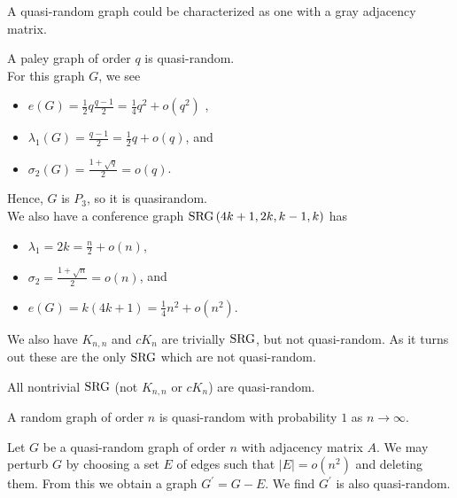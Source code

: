 \begin{recall}
	A quasi-random graph could be characterized as one with a gray adjacency matrix.
\end{recall}
\begin{example}
	A paley graph of order \(q\) is quasi-random.\\
For this graph \(G\), we see
\begin{itemize}
	\item \(e\left( G \right) = \frac{1}{2}q \frac{q-1}{2} = \frac{1}{4}q^2 + o\left( q^2 \right) \) ,
	\item \(\lambda_1\left( G \right) = \frac{q-1}{2} = \frac{1}{2}q + o\left( q \right)   \), and
	\item \(\sigma_2 \left( G \right) = \frac{1 + \sqrt{q} }{2} = o\left( q \right) \).
\end{itemize}
Hence, \(G\) is \(P_3\), so it is quasirandom.\\
We also have a conference graph \(\operatorname{SRG} \left( 4 k + 1, 2k, k-1, k \right) \) has
\begin{itemize}
	\item \(\lambda_1 = 2k = \frac{n}{2} + o\left( n \right) \),
	\item \(\sigma_2 = \frac{1 + \sqrt{n} }{2} = o\left( n \right) \), and
	\item \(e\left( G \right)  = k\left( 4k+1 \right) = \frac{1}{4}n^2 + o\left( n^2 \right) \).
\end{itemize}
We also have \(K_{n, n} \)  and \(cK_{n} \) are trivially \(\operatorname{SRG}\), but not quasi-random. As it turns out these are the only \(\operatorname{SRG}\) which are not quasi-random.
\end{example}
\begin{proposition}
	All nontrivial \(\operatorname{SRG}\) (not \(K_{n, n} \) or \(cK_{n} \)) are quasi-random.
\end{proposition}
\begin{remark}
	A random graph of order \(n\) is quasi-random with probability \(1\) as \(n \to \infty\).
\end{remark}
\begin{definition}[Perturbation]
	Let \(G\) be a quasi-random graph of order \(n\) with adjacency matrix \(A\). We may perturb \(G\) by choosing a set \(E\) of edges such that \(\left| E \right| = o\left( n^2 \right) \) and deleting them. From this we obtain a graph \(G^{\prime} = G - E\). We find \(G^{\prime}\) is also quasi-random.
\end{definition}
